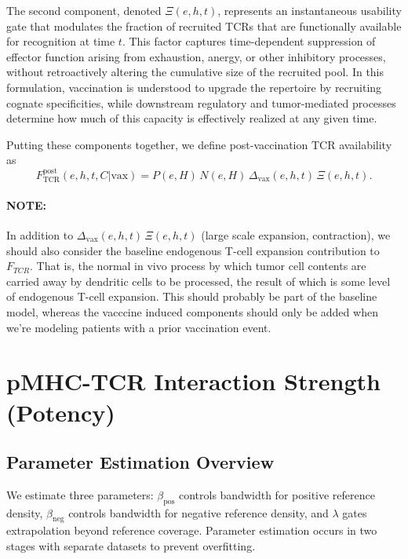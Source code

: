 \documentclass[11pt]{article}
\begin{document}
The second component, denoted \(\Xi(e,h,t)\), represents an instantaneous usability gate that modulates the fraction of recruited TCRs that are functionally available for recognition at time \(t\). This factor captures time-dependent suppression of effector function arising from exhaustion, anergy, or other inhibitory processes, without retroactively altering the cumulative size of the recruited pool. In this formulation, vaccination is understood to upgrade the repertoire by recruiting cognate specificities, while downstream regulatory and tumor-mediated processes determine how much of this capacity is effectively realized at any given time.

Putting these components together, we define post-vaccination TCR availability as
\begin{equation}
F_{\mathrm{TCR}}^{\mathrm{post}}(e,h,t,C|\mathrm{vax})
=
P(e,H)\,N(e,H)\,\Delta_{\mathrm{vax}}(e,h,t)\,\Xi(e,h,t).
\label{eq:FTCR_post}
\end{equation}

\paragraph{NOTE:} In addition to $\Delta_{\mathrm{vax}}(e,h,t)\,\Xi(e,h,t)$ (large scale expansion, contraction), we should also consider the baseline endogenous T-cell expansion contribution to $F_{TCR}$. That is, the normal in vivo process by which tumor cell contents are carried away by dendritic cells to be processed, the result of which is some level of endogenous T-cell expansion. This should probably be part of the baseline model, whereas the vacccine induced components should only be added when we're modeling patients with a prior vaccination event.
\newpage
\section{pMHC-TCR Interaction Strength (Potency)}
\label{sec:potency}

\subsection{Parameter Estimation Overview}

We estimate three parameters: $\beta_{\mathrm{pos}}$ controls bandwidth for positive reference density, $\beta_{\mathrm{neg}}$ controls bandwidth for negative reference density, and $\lambda$ gates extrapolation beyond reference coverage. Parameter estimation occurs in two stages with separate datasets to prevent overfitting.
\end{document}
